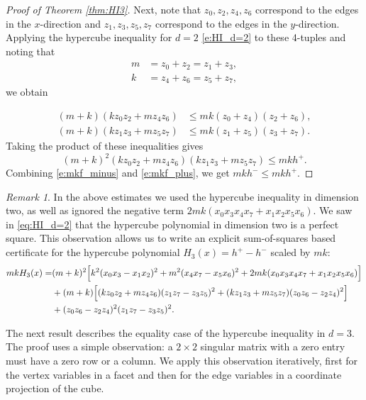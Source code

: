 \documentclass[11pt]{amsart}
\theoremstyle{definition}
\theoremstyle{remark}
\newtheorem{rmk}[thm]{Remark}
\begin{document}
\begin{proof}[Proof of Theorem \ref{thm:HI3}]
Next, note that $z_0,z_2,z_4,z_6$ correspond to the edges in the $x$-direction and $z_1,z_3,z_5,z_7$ correspond to the edges in the $y$-direction. 
Applying the hypercube inequality for $d=2$ \eqref{e:HI_d=2} to these 4-tuples and
noting that %
\begin{align*}
m &= z_0 + z_2 = z_1 + z_3, \\
k &= z_4 + z_6 = z_5 + z_7, 
\end{align*}
we obtain

\begin{align*}
(m+k)(kz_0z_2 + mz_4z_6) &\leq mk(z_0 + z_4)(z_2 + z_6),\\
(m+k)(kz_1z_3 + mz_5z_7) &\leq mk(z_1 + z_5)(z_3 + z_7).    
\end{align*}
Taking the product of these inequalities gives
\begin{equation}\label{e:mkf_plus}
 (m+k)^2(kz_0z_2 + mz_4z_6)(kz_1z_3 + mz_5z_7) \leq mkh^+.   
\end{equation}
Combining \eqref{e:mkf_minus} and \eqref{e:mkf_plus}, we get $mkh^-\leq mkh^+$.
\end{proof}

\begin{rmk}\label{R:equality_case}
    In the above estimates we used the hypercube inequality in dimension two, as well as ignored the negative term $2mk(x_0x_3x_4x_7 + x_1x_2x_5x_6)$. We saw in \eqref{eq:HI_d=2} that the hypercube polynomial in dimension two is a perfect square. This observation allows us to write an explicit sum-of-squares based certificate for the hypercube polynomial $H_3(x)=h^+-h^-$ scaled by $mk$:
\begin{align*}\label{e:mkf-certificate}
mkH_3(x) =&(m+k)^2\Big[k^2(x_0x_3-x_1x_2)^2+m^2(x_4x_7-x_5x_6)^2
+ 2mk(x_0x_3x_4x_7 + x_1x_2x_5x_6)\Big]\\
 &+ (m+k)\Big[(kz_0z_2 + mz_4z_6)(z_1z_7-z_3z_5)^2
+(kz_1z_3 + mz_5z_7)(z_0z_6-z_2z_4)^2\Big]\notag\\
&+(z_0z_6-z_2z_4)^2(z_1z_7-z_3z_5)^2\notag. 
\end{align*}
\end{rmk}

The next result describes the equality case of the hypercube inequality in $d=3$. The proof uses a simple observation: a $2\times 2$ singular matrix with a zero entry must have a zero row or a column. We apply this observation iteratively, first for the vertex variables in a facet and then for the edge variables in a coordinate projection of the cube.
\end{document}
